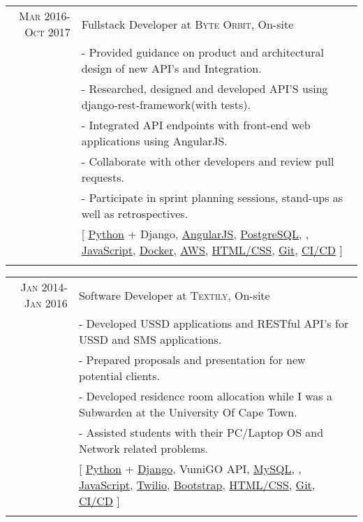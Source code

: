 \documentclass[a4paper,10pt]{article} %
\begin{document}
\begin{tabular}{r|p{15cm}}
\textsc{Mar 2016-Oct 2017} & Fullstack Developer at \textsc{Byte Orbit}, On-site \emph{}\\
& \footnotesize{- Provided guidance on product and architectural design of new API’s and Integration.}\\
& \footnotesize{- Researched, designed and developed API’S using django-rest-framework(with tests).}\\
& \footnotesize{- Integrated API endpoints with front-end web applications using AngularJS.}\\
& \footnotesize{- Collaborate with other developers and review pull requests.}\\
& \footnotesize{- Participate in sprint planning sessions, stand-ups as well as retrospectives.}\\
& \footnotesize{[ \href{https://www.python.org/}{Python} + Django, \href{https://angular.dev/}{AngularJS}, \href{https://www.postgresql.org/}{PostgreSQL}, \href{}{}, \href{https://developer.mozilla.org/en-US/docs/Web/JavaScript}{JavaScript}, \href{https://www.docker.com/}{Docker}, \href{https://aws.amazon.com/s3/}{AWS}, \href{https://datatracker.ietf.org/doc/html/rfc7993}{HTML/CSS}, \href{https://git-scm.com/}{Git}, \href{https://en.wikipedia.org/wiki/CI/CD}{CI/CD} ]}\\
\multicolumn{2}{c}{} \\
\end{tabular}

\begin{tabular}{rl}	
\textsc{Jan 2014-Jan 2016} & Software Developer at \textsc{Textily}, On-site \emph{}\\
& \footnotesize{- Developed USSD applications and RESTful API’s for USSD and SMS applications.}\\
& \footnotesize{- Prepared proposals and presentation for new potential clients.}\\
& \footnotesize{- Developed residence room allocation while I was a Subwarden at the University Of Cape Town.}\\
& \footnotesize{- Assisted students with their PC/Laptop OS and Network related problems.}\\
& \footnotesize{[ \href{https://www.python.org/}{Python} + \href{https://www.djangoproject.com/}{Django}, {VumiGO API}, \href{https://www.mysql.com/}{MySQL}, \href{}{}, \href{https://developer.mozilla.org/en-US/docs/Web/JavaScript}{JavaScript}, \href{https://www.twilio.com/en-us}{Twilio}, \href{https://getbootstrap.com/}{Bootstrap}, \href{https://datatracker.ietf.org/doc/html/rfc7993}{HTML/CSS}, \href{https://git-scm.com/}{Git}, \href{https://en.wikipedia.org/wiki/CI/CD}{CI/CD} ]}\\
\multicolumn{2}{c}{} \\
\end{tabular}
\end{document}
